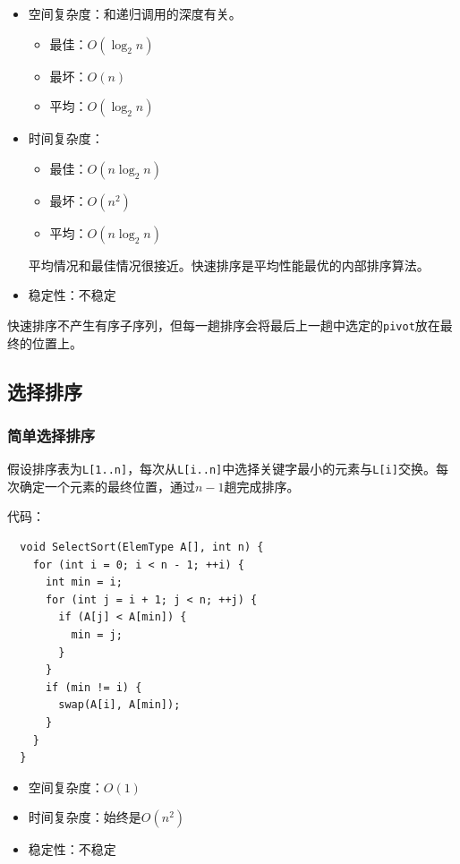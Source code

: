 \documentclass[12pt, a4paper, oneside]{ctexart}
\begin{document}
\begin{itemize}
  \item 空间复杂度：和递归调用的深度有关。
  \begin{itemize}
    \item 最佳：$O(\log_2 n)$
    \item 最坏：$O(n)$
    \item 平均：$O(\log_2 n)$
  \end{itemize}
  \item 时间复杂度：
  \begin{itemize}
    \item 最佳：$O(n\log_2 n)$
    \item 最坏：$O(n^2)$
    \item 平均：$O(n\log_2 n)$
  \end{itemize}
  
  平均情况和最佳情况很接近。\textcolor{juice-water-blue}{快速排序是平均性能最优的内部排序算法}。

  \item 稳定性：不稳定
\end{itemize}

快速排序不产生有序子序列，但每一趟排序会将最后上一趟中选定的\verb|pivot|放在最终的位置上。

\subsection{选择排序}

\subsubsection{简单选择排序}

假设排序表为\verb|L[1..n]|，每次从\verb|L[i..n]|中选择关键字最小的元素与\verb|L[i]|交换。每次确定一个元素的最终位置，通过$n-1$趟完成排序。

代码：
\begin{lstlisting}
  void SelectSort(ElemType A[], int n) {
    for (int i = 0; i < n - 1; ++i) {
      int min = i;
      for (int j = i + 1; j < n; ++j) {
        if (A[j] < A[min]) {
          min = j;
        }
      }
      if (min != i) {
        swap(A[i], A[min]);
      }
    }
  }
\end{lstlisting}

\begin{itemize}
  \item 空间复杂度：$O(1)$
  \item 时间复杂度：始终是$O(n^2)$
  \item 稳定性：不稳定
\end{itemize}
\end{document}
